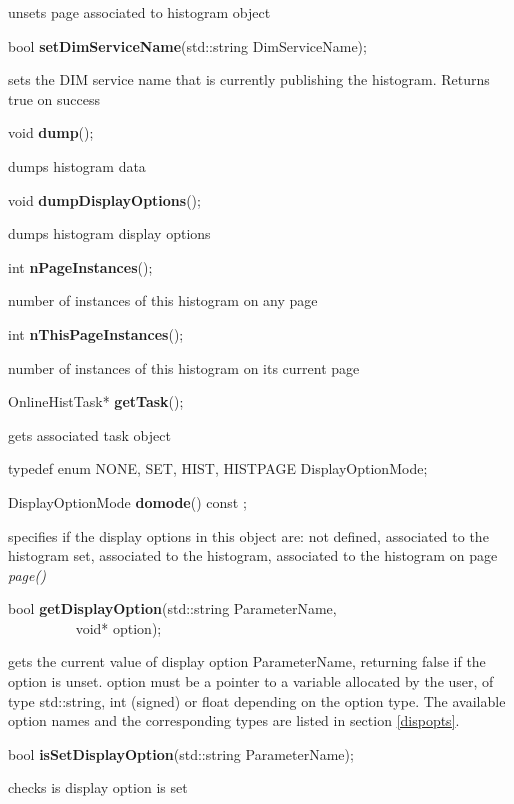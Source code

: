  unsets page associated to histogram object


\item    bool {\bf setDimServiceName}(std::string DimServiceName);


 sets the DIM service name that is currently publishing the histogram. Returns true on success


\item    void {\bf dump}();


 dumps histogram data


\item    void {\bf dumpDisplayOptions}();


 dumps histogram display options


\item    int {\bf nPageInstances}();


 number of instances of this histogram on any page


\item    int {\bf nThisPageInstances}();


 number of instances of this histogram on its current page


\item    OnlineHistTask* {\bf getTask}();


 gets associated task object


\item   typedef enum { NONE, SET, HIST, HISTPAGE } DisplayOptionMode;
\item    DisplayOptionMode {\bf domode}() const ;

 specifies if the display options in this object are: not defined,
 associated to the histogram set, associated to the histogram,
 associated to the histogram on  page {\it page()}


\item    bool {\bf getDisplayOption}(std::string ParameterName,\\\mbox{}~~~~~~~~~
			void* option);

 gets the current value of display option ParameterName, returning false if
 the option is unset.
 option must be a pointer to a variable allocated by the user, of type 
 std::string, int (signed) or float depending on the option type.
 The available option names and the corresponding types are listed 
 in section \ref{dispopts}.


\item    bool {\bf isSetDisplayOption}(std::string ParameterName);


 checks is display option is set


